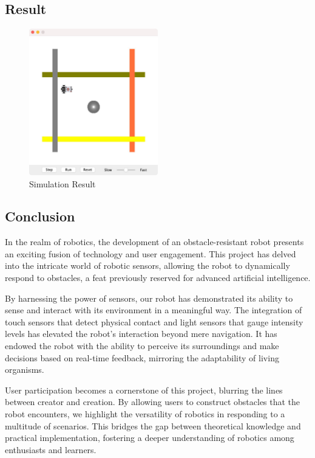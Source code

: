 \subsection{Result}


\begin{figure}[h]
  \centering
  \includegraphics[width=0.5\textwidth]{images/result.jpeg}
  \caption{Simulation Result}
  \label{fig:result}
\end{figure}



\subsection{Conclusion}
In the realm of robotics, the development of an obstacle-resistant robot presents an exciting fusion of technology and user engagement. This project has delved into the intricate world of robotic sensors, allowing the robot to dynamically respond to obstacles, a feat previously reserved for advanced artificial intelligence.

By harnessing the power of sensors, our robot has demonstrated its ability to sense and interact with its environment in a meaningful way. The integration of touch sensors that detect physical contact and light sensors that gauge intensity levels has elevated the robot's interaction beyond mere navigation. It has endowed the robot with the ability to perceive its surroundings and make decisions based on real-time feedback, mirroring the adaptability of living organisms.

User participation becomes a cornerstone of this project, blurring the lines between creator and creation. By allowing users to construct obstacles that the robot encounters, we highlight the versatility of robotics in responding to a multitude of scenarios. This bridges the gap between theoretical knowledge and practical implementation, fostering a deeper understanding of robotics among enthusiasts and learners.

